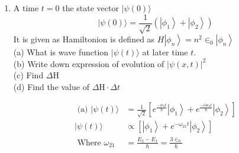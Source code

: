 \begin{enumerate}
\begin{answer}
\begin{align*}
		&=2 \hbar \omega \times \frac{2}{3}+3 \hbar \omega \times \frac{1}{3} \quad\langle H\rangle=\frac{7 \hbar \omega}{3}\\
		\left\langle H^{2}\right\rangle&=\frac{\left\langle\psi\left|H^{2}\right| \psi\right\rangle}{\langle\psi \mid \psi\rangle}=\Sigma P_{n}\left(a_{n}\right) a_{n}^{2}=\frac{2}{3} \times(2 \hbar \omega)^{2}+\frac{1}{3} \times(3 \hbar \omega)^{2}\\&=\frac{8 \hbar^{2} \omega^{2}}{3}+\frac{9 \hbar^{2} \omega^{2}}{3}=\frac{17 \hbar^{2} \omega^{2}}{3}
	\end{align*}
	(d)The error in measurement in $\mathrm{H}$ is given as
	\begin{align*}
	\Delta H=\sqrt{\left\langle H^{2}\right\rangle-\langle H\rangle^{2}} & \left\langle H^{2}\right\rangle=\frac{17 \hbar^{2} \omega^{2}}{3} \\
	\langle H\rangle^{2}=\left(\frac{7 \hbar \omega}{3}\right)^{2}=\frac{49 \hbar^{2} \omega^{2}}{9} & \Delta H=\sqrt{\frac{17}{3}-\frac{49}{9}} \hbar \omega\\
	\Delta H&=\sqrt{\frac{51-49}{9}} \hbar \omega=\frac{\sqrt{2}}{3} \hbar \omega
	\end{align*}
\end{answer}
	\item  A time $t=0$ the state vector $|\psi(0)\rangle$
	$$
	|\psi(0)\rangle=\frac{1}{\sqrt{2}}\left(\left|\phi_{1}\right\rangle+\left|\phi_{2}\right\rangle\right)
	$$
	It is given as Hamiltonion is defined as $H\left|\phi_{n}\right\rangle=n^{2} \in_{0}\left|\phi_{n}\right\rangle$\\
	(a) What is wave function $|\psi(t)\rangle$ at later time $t$.\\
	(b) Write down expression of evolution of $|\psi(x, t)|^{2}$\\
	(c) Find $\Delta \mathrm{H}$\\
	(d) Find the value of $\Delta \mathrm{H} \cdot \Delta t$
\begin{answer}
	\begin{align*}
	\text { (a) }|\psi(t)\rangle&=\frac{1}{\sqrt{2}}\left[e^{\frac{-i \epsilon_{0} t}{\hbar}}\left|\phi_{1}\right\rangle+e^{\frac{-i 4 \epsilon_{0} t}{\hbar}}\left|\phi_{2}\right\rangle\right]\\
	|\psi(t)\rangle &\propto\left[\left|\phi_{1}\right\rangle+e^{-\omega_{21} t}\left|\phi_{2}\right\rangle\right]\\
	\text { Where } \omega_{21}&=\frac{E_{2}-E_{1}}{\hbar}=\frac{3 \in_{0}}{\hbar}
	\end{align*}

\end{answer}
\end{enumerate}
